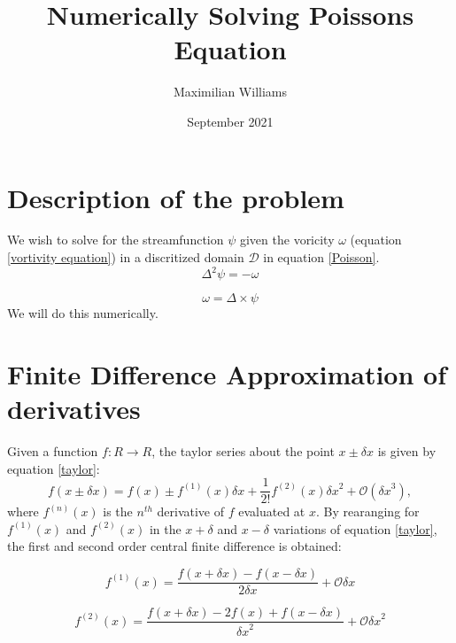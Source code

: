\documentclass{article}
\title{Numerically Solving Poissons Equation}
\author{Maximilian Williams}
\date{September 2021}
\begin{document}
\maketitle


\section*{Description of the problem}

We wish to solve for the streamfunction $\psi$ given the voricity $\omega$ (equation \ref{vortivity equation}) in a discritized domain $\mathcal{D}$ in equation \ref{Poisson}.
\begin{equation}
	\Delta^2 \psi = -\omega
	\label{Poisson}
\end{equation}

\begin{equation}
	\omega = \Delta \times \psi
	\label{vorticity equation}
\end{equation}
We will do this numerically.

\section*{Finite Difference Approximation of derivatives}
Given a function $f:R\rightarrow R$, the taylor series about the point $x\pm \delta x$ is given by equation \ref{taylor}:
\begin{equation}
	f(x \pm \delta x) = f(x) \pm  f^{(1)}(x) \delta x + \frac{1}{2!} f^{(2)}(x) {\delta x}^2 + \mathcal{O}({\delta x}^3),
	\label{taylor}
\end{equation}
where $f^{(n)}(x)$ is the $n^{th}$ derivative of $f$ evaluated at $x$. By rearanging for $f^{(1)}(x)$ and $f^{(2)}(x)$ in the $x+\delta$ and $x-\delta$ variations of equation \ref{taylor}, the first and second order central finite difference is obtained:

\begin{equation}
	f^{(1)}(x) = \frac{f(x+\delta x) - f(x - \delta x)}{2 \delta x} + \mathcal{O}{\delta x}
	\label{first order central difference}
\end{equation}

\begin{equation}
	f^{(2)}(x) = \frac{f(x+\delta x) - 2 f(x) + f(x - \delta x)}{ {\delta x}^2 } + \mathcal{O}{\delta x}^2
	\label{second order central difference}
\end{equation}
\end{document}

